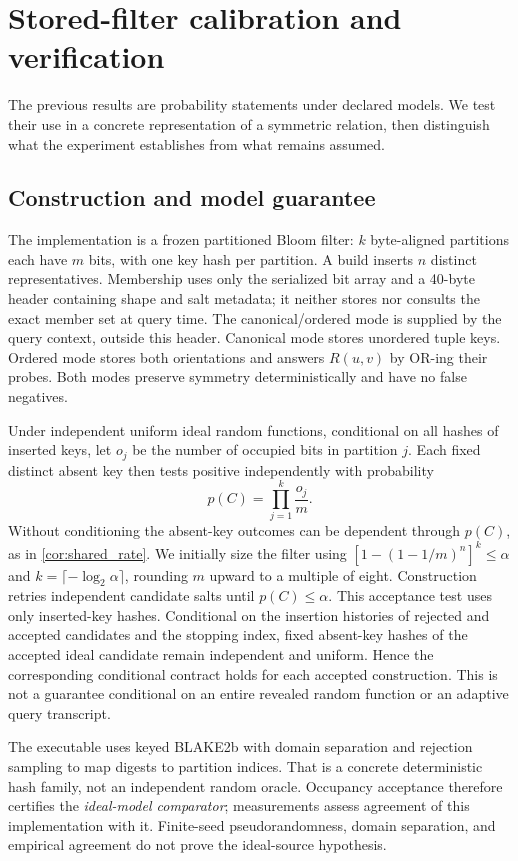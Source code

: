 \documentclass[../main.tex]{subfiles}
\begin{document}
\section{Stored-filter calibration and verification}
\label{sec:calibration}
The previous results are probability statements under declared models.
We test their use in a concrete representation of a symmetric relation,
then distinguish what the experiment establishes from what remains assumed.

\subsection{Construction and model guarantee}
The implementation is a frozen partitioned Bloom filter: $k$ byte-aligned
partitions each have $m$ bits, with one key hash per partition. A build
inserts $n$ distinct representatives. Membership uses only the serialized
bit array and a 40-byte header containing shape and salt metadata;
it neither stores nor consults the exact member set at query time.
The canonical/ordered mode is supplied by the query context, outside this header.
Canonical mode stores unordered tuple keys. Ordered mode stores both
orientations and answers $R(u,v)$ by OR-ing their probes. Both modes
preserve symmetry deterministically and have no false negatives.

Under independent uniform ideal random functions, conditional on all hashes
of inserted keys, let $o_j$ be the number of occupied bits in partition $j$.
Each fixed distinct absent key then tests positive independently with
probability
\begin{equation}
 p(C)=\prod_{j=1}^k\frac{o_j}{m}.
 \label{eq:occupancy_fpr}
\end{equation}
Without conditioning the absent-key outcomes can be dependent through
$p(C)$, as in \cref{cor:shared_rate}. We initially size the filter using
$[1-(1-1/m)^n]^k\leq\alpha$ and $k=\lceil-\log_2\alpha\rceil$,
rounding $m$ upward to a multiple of eight. Construction retries independent
candidate salts until $p(C)\leq\alpha$. This acceptance test uses only
inserted-key hashes. Conditional on the insertion histories of rejected and
accepted candidates and the stopping index, fixed absent-key hashes of the
accepted ideal candidate remain independent and uniform. Hence the
corresponding conditional contract holds for each accepted construction.
This is not a guarantee conditional on an entire revealed random function
or an adaptive query transcript.

The executable uses keyed BLAKE2b with domain separation and rejection
sampling to map digests to partition indices. That is a concrete deterministic
hash family, not an independent random oracle. Occupancy acceptance therefore
certifies the \emph{ideal-model comparator}; measurements assess agreement
of this implementation with it. Finite-seed pseudorandomness, domain separation,
and empirical agreement do not prove the ideal-source hypothesis.
\end{document}
